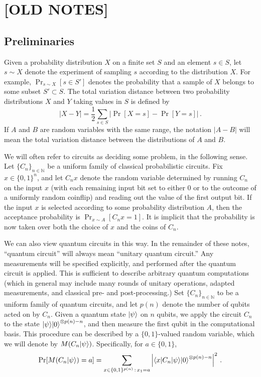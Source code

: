 \documentclass[11pt]{article}
\numberwithin{equation}{section}
\newcommand{\N}{\mathbb{N}}
\begin{document}
\section{[OLD NOTES]}

\subsection{Preliminaries}
Given a probability distribution $X$ on a finite set $S$ and an element $s \in S$, let $s \sim X$ denote the experiment of sampling $s$ according to the distribution $X$. For example, $\Pr_{s \sim X} [s \in S']$ denotes the probability that a sample of $X$ belongs to some subset $S' \subset S$. The total variation distance between two probability distributions $X$ and $Y$ taking values in $S$ is defined by
$$
|X - Y| = \frac{1}{2} \sum_{s \in S} \bigl|\Pr[X=s] - \Pr[Y=s]\bigr|\,.
$$
If $A$ and $B$ are random variables with the same range, the notation $|A-B|$ will mean the total variation distance between the distributions of $A$ and $B$.


We will often refer to circuits as deciding some problem, in the following sense. Let $\{C_n\}_{n \in \N}$ be a uniform family of classical probabilistic circuits. Fix $x \in \{0,1\}^n$, and let $C_n x$ denote the random variable determined by running $C_n$ on the input $x$ (with each remaining input bit set to either $0$ or to the outcome of a uniformly random coinflip) and reading out the value of the first output bit. If the input $x$ is selected according to some probability distribution $A$, then the acceptance probability is $\Pr_{x \sim A}[C_n x = 1]$. It is implicit that the probability is now taken over both the choice of $x$ and the coins of $C_n$.

We can also view quantum circuits in this way. In the remainder of these notes, ``quantum circuit'' will always mean ``unitary quantum circuit.'' Any measurements will be specified explicitly, and performed after the quantum circuit is applied. This is sufficient to describe arbitrary quantum computations (which in general may include many rounds of unitary operations, adapted measurements, and classical pre- and post-processing.) Set $\{C_n\}_{n \in \N}$ to be a uniform family of quantum circuits, and let $p(n)$ denote the number of qubits acted on by $C_n$. Given a quantum state ${\left\vert{\psi}\right\rangle}$ on $n$ qubits, we apply the circuit $C_n$ to the state ${\left\vert{\psi}\right\rangle} {\left\vert{0}\right\rangle}^{\otimes p(n)-n}$, and then measure the first qubit in the computational basis. This procedure can be described by a $\{0,1\}$-valued random variable, which we will denote by $M(C_n {\left\vert{\psi}\right\rangle})$. Specifically, for $a \in \{0,1\}$,
$$
\Pr[M(C_n {\left\vert{\psi}\right\rangle}) = a] = \sum_{x \in \{0,1\}^{p(n)}\,:\,x_1 = a} \left| {\left\langle{x}\right\vert} C_n {\left\vert{\psi}\right\rangle} {\left\vert{0}\right\rangle}^{\otimes p(n)-n} \right|^2\,.
$$
\end{document}
